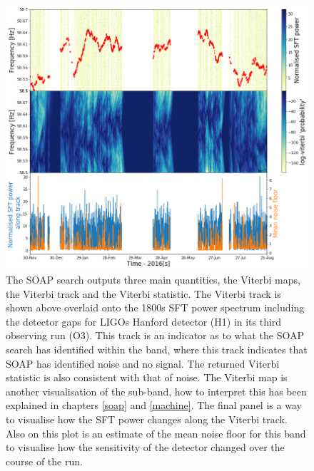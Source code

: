 \begin{figure}[hpt]
	\centering
	\includegraphics[width=\textwidth]{C6_detchar/track_F58_5_58_7_noise.png}
	\caption[Example SOAP output for Gaussian like noise.]{The SOAP search outputs three main
quantities, the Viterbi maps, the Viterbi track and the Viterbi statistic. The
Viterbi track is shown above overlaid onto the 1800s \gls{SFT} power spectrum
including the detector gaps for \glspl{LIGO} Hanford detector (H1) in its
third observing run (O3). This track is an indicator as to what the SOAP search has identified within the band, where this track indicates that SOAP has identified noise and no signal. The returned Viterbi statistic is also consistent with that of noise.
The Viterbi map is another visualisation of the sub-band, how to interpret this
has been explained in chapters \ref{soap} and \ref{machine}. The final panel is a way to visualise how the \gls{SFT}
power changes along the Viterbi track. Also on this plot is an estimate of the
mean noise floor for this band to visualise how the sensitivity of the detector
changed over the course of the run.}

	\label{detchar:soap:noiseplot}
\end{figure}

%

